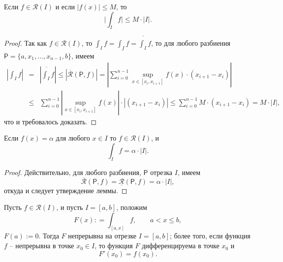 \begin{lemma}\label{|int|<M}
    Если $f\in \mathscr{R}(I)$ и если $|f(x)| \le M$, то
    \[
     \bigl| \int_I f  \bigr| \le M\cdot |I|.
    \]
\end{lemma}
\begin{proof}
Так как $f \in \mathscr{R}(I)$, то $\int_I f = \underline{\int_I f} = \overline{\int_I}f$, то для любого разбиения $\mathsf{P} = \{a,x_1,\ldots, x_{n-1},b\}$, имеем
 \begin{eqnarray*}
 \left|\int_If \right|&=&\left|\overline{\int_I}f \right| \le \left|\overline{\mathcal{R}}(\mathsf{P},f) \right|  = \left| \sum_{i=0}^{n-1} \sup_{x\in [x_i,x_{i+1}]}f(x) \cdot(x_{i+1} - x_i)  \right|        \\
 &\le & \sum_{i=0}^{n-1} \left|\sup_{x\in [x_i,x_{i+1}]}f(x) \right| \cdot \left|(x_{i+1} - x_i)\right| \le \sum_{i=0}^{n-1} M \cdot(x_{i+1} - x_i) = M\cdot |I|,  
 \end{eqnarray*}
 что и требовалось доказать.    
\end{proof}


\begin{lemma}\label{int(a)}
    Если $f(x) = \alpha $ для любого $x \in I$ то $f\in \mathscr{R}(I)$, и
    \[
     \int_I f = \alpha \cdot |I|.
    \]
\end{lemma}

\begin{proof}
    Действительно, для любого разбиения, $\mathsf{P}$ отрезка $I$, имеем
    \[
     \overline{\mathcal{R}}(\mathsf{P},f) = \underline{\mathcal{R}}(\mathsf{P},f) = \alpha \cdot |I|,
    \]
    откуда и следует утверждение леммы.
\end{proof}



\begin{theorem}\label{the_first_fundamental_theorem}
 Пусть $f\in \mathscr{R}(I)$, и пусть $I = [a,b]$, положим
    \[
     F(x): = \int_{[a,x]}f, \qquad  a < x \le b, 
    \]
    $F(a):=0$. Тогда $F$ непрерывна на отрезке $I=[a,b]$; более того, если функция $f$ -- непрерывна в точке $x_0 \in I$, то функция $F$ дифференцируема в точке $x_0$ и 
    \[
     F'(x_0) = f(x_0).
    \]
\end{theorem}

